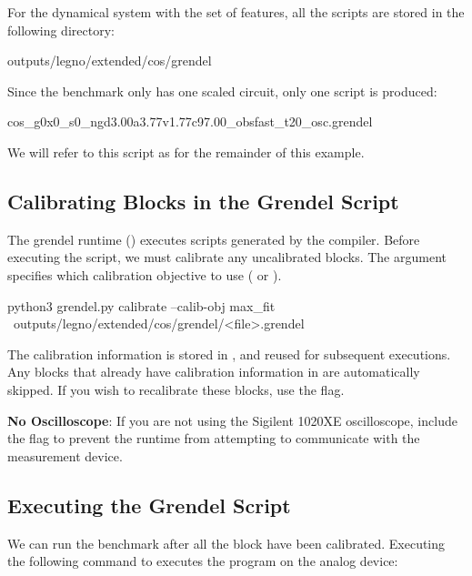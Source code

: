 For the  dynamical system with the  set of features, all
the \grendel scripts are stored in the following directory:

\begin{snippet}
  outputs/legno/extended/cos/grendel
\end{snippet}

Since the  benchmark only has one scaled circuit, only one \grendel
script is produced:

\begin{snippet}
  cos_g0x0_s0_ngd3.00a3.77v1.77c97.00_obsfast_t20_osc.grendel
\end{snippet}

We will refer to this script as  for the remainder of this
example.

\subsection{Calibrating Blocks in the Grendel Script}

The grendel runtime () executes  scripts generated
by the \legno compiler. Before executing the script, we must calibrate any
uncalibrated blocks. The  argument specifies which calibration
objective to use ( or ).


\begin{snippet}
python3 grendel.py calibrate --calib-obj max_fit \
  outputs/legno/extended/cos/grendel/<file>.grendel 
\end{snippet}

\noindent The calibration information is stored in , and reused
for subsequent executions. Any blocks that already have calibration information
in \tx{state.db} are automatically skipped. If you wish to recalibrate these
blocks, use the \tx{--recompute} flag. 


\noindent\textbf{No Oscilloscope}: If you are not using the
Sigilent 1020XE oscilloscope, include the  flag to prevent
the runtime from attempting to communicate with the measurement device.

\subsection{Executing the Grendel Script}


We can run the benchmark after all the block have been calibrated. Executing the
following command to executes the program on the analog device:

